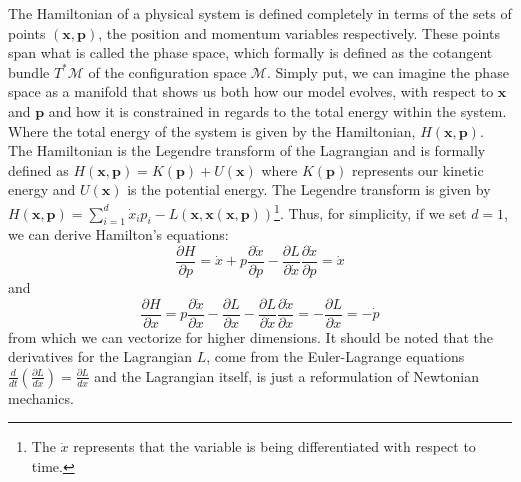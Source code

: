 The Hamiltonian of a physical system is defined completely in terms of the sets of points $(\textbf{x}, \textbf{p})$, the position and momentum variables respectively. These points span what is called the phase space, which formally is defined as the cotangent bundle $T^{*}\mathcal{M}$ of the configuration space $\mathcal{M}$. Simply put, we can imagine the phase space as a manifold that shows us both how our model evolves, with respect to $\textbf{x}$ and $\textbf{p}$ and how it is constrained in regards to the total energy within the system. Where the total energy of the system is given by the Hamiltonian, $H(\textbf{x},\textbf{p})$. The Hamiltonian is the Legendre transform of the Lagrangian and is formally defined as $
H(\textbf{x}, \textbf{p})  = K(\textbf{p}) + U(\textbf{x})$ where $K(\textbf{p})$ represents our kinetic energy and $U(\textbf{x})$ is the potential energy. The Legendre transform is given by $H(\textbf{x},\textbf{p}) = \sum_{i = 1}^{d}\dot{x}_{i}p_{i} - L(\textbf{x}, \textbf{\.{x}}(\textbf{x}, \textbf{p})) $\footnote{The $\dot{x}$ represents that the variable is being differentiated with respect to time.}.  
Thus, for simplicity, if we set $d = 1$, we can derive Hamilton's equations: 
\begin{equation}
\label{eq:hameq1}
\frac{\partial H}{\partial p} = \dot{x} + p\frac{\partial \dot{x}}{\partial p} - \frac{\partial L}{\partial \dot{x}}\frac{\partial \dot{x}}{\partial p} = \dot{x} 
\end{equation}
and 
\begin{equation}
\label{eq:hameq2}
\frac{\partial H}{\partial x} = p\frac{\partial \dot{x}}{\partial x} - \frac{\partial L}{\partial x} - \frac{\partial L}{\partial \dot{x}}\frac{\partial \dot{x}}{\partial x} = - \frac{\partial L}{\partial x}= -\dot{p}  
\end{equation}
from which we can vectorize for higher dimensions. It should be noted that the derivatives for the Lagrangian $L$, come from the Euler-Lagrange equations $\frac{d}{dt}\left(\frac{\partial L}{d\dot{x}}\right) = \frac{\partial L}{dx}$ and the Lagrangian itself, is just a reformulation of Newtonian mechanics.

